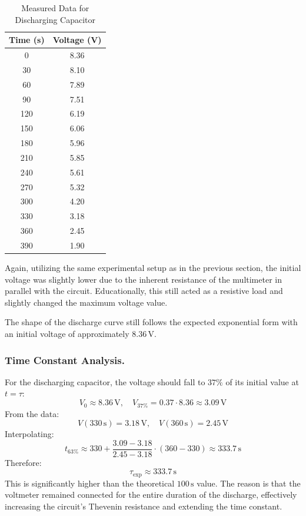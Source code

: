 \documentclass[12pt]{article}
\begin{document}
\begin{table}[H]
	\centering
	\begin{tabular}{|c|c|}
		\hline
		Time (s) & Voltage (V) \\
		\hline
		0        & 8.36        \\
		\hline
		30       & 8.10        \\
		\hline
		60       & 7.89        \\
		\hline
		90       & 7.51        \\
		\hline
		120      & 6.19        \\
		\hline
		150      & 6.06        \\
		\hline
		180      & 5.96        \\
		\hline
		210      & 5.85        \\
		\hline
		240      & 5.61        \\
		\hline
		270      & 5.32        \\
		\hline
		300      & 4.20        \\
		\hline
		330      & 3.18        \\
		\hline
		360      & 2.45        \\
		\hline
		390      & 1.90        \\
		\hline
	\end{tabular}
	\caption{Measured Data for Discharging Capacitor}
\end{table}

Again, utilizing the same experimental setup as in the previous section, the
initial voltage was slightly lower due to the inherent resistance of the
multimeter in parallel with the circuit. Educationally, this still acted as a
resistive load and slightly changed the maximum voltage value.

The shape of the discharge curve still follows the expected exponential form
with an initial voltage of approximately $8.36\,\mathrm{V}$.

\subsubsection{Time Constant Analysis.}

For the discharging capacitor, the voltage should fall to $37\%$ of its initial
value at $t = \tau$:
\[
	V_0 \approx 8.36\,\mathrm{V}, \quad V_{37\%} = 0.37 \cdot 8.36 \approx 3.09\,\mathrm{V}
\]
From the data:
\[
	V(330\,\mathrm{s}) = 3.18\,\mathrm{V}, \quad V(360\,\mathrm{s}) = 2.45\,\mathrm{V}
\]
Interpolating:
\[
	t_{63\%} \approx 330 + \frac{3.09 - 3.18}{2.45 - 3.18} \cdot (360 - 330)
	\approx 333.7\,\mathrm{s}
\]
Therefore:
\[
	\tau_{\text{exp}} \approx 333.7\,\mathrm{s}
\]
This is significantly higher than the theoretical $100\,\mathrm{s}$ value. The
reason is that the voltmeter remained connected for the entire duration of the
discharge, effectively increasing the circuit’s Thevenin resistance and extending
the time constant.
\end{document}
